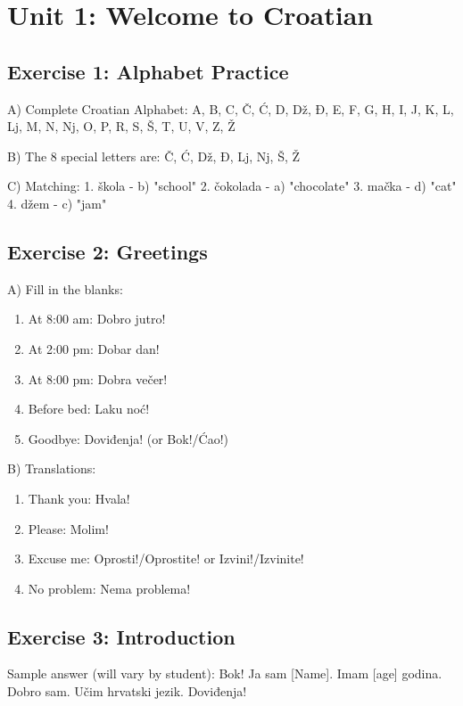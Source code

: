 
\section{Unit 1: Welcome to Croatian}

\subsection*{Exercise 1: Alphabet Practice}

A) Complete Croatian Alphabet:
A, B, C, Č, Ć, D, Dž, Đ, E, F, G, H, I, J, K, L, Lj, M, N, Nj, O, P, R, S, Š, T, U, V, Z, Ž

B) The 8 special letters are: Č, Ć, Dž, Đ, Lj, Nj, Š, Ž

C) Matching:
1. škola - b) "school"
2. čokolada - a) "chocolate"
3. mačka - d) "cat"
4. džem - c) "jam"

\subsection*{Exercise 2: Greetings}

A) Fill in the blanks:
\begin{enumerate}
    \item At 8:00 am: Dobro jutro!
    \item At 2:00 pm: Dobar dan!
    \item At 8:00 pm: Dobra večer!
    \item Before bed: Laku noć!
    \item Goodbye: Doviđenja! (or Bok!/Ćao!)
\end{enumerate}

B) Translations:
\begin{enumerate}
    \item Thank you: Hvala!
    \item Please: Molim!
    \item Excuse me: Oprosti!/Oprostite! or Izvini!/Izvinite!
    \item No problem: Nema problema!
\end{enumerate}

\subsection*{Exercise 3: Introduction}

Sample answer (will vary by student):
Bok! Ja sam [Name]. Imam [age] godina. Dobro sam. Učim hrvatski jezik. Doviđenja!

